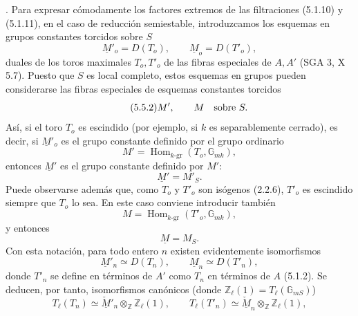 \par\medskip
{}. Para expresar cómodamente los factores extremos de las
filtraciones (5.1.10) y (5.1.11), en el caso de reducción semiestable,
introduzcamos los esquemas en grupos constantes torcidos sobre $S$
\begin{equation}\tag{5.5.1}
 \underline M'_o=D(T_o),\qquad \underline M_o=D(T'_o),
\end{equation}
duales de los toros maximales $T_o,T'_o$ de las fibras especiales de
$A,A'$ (SGA 3, X 5.7). Puesto que $S$ es local completo, estos esquemas
en grupos pueden considerarse las fibras especiales de esquemas
constantes torcidos
\begin{equation}\tag{5.5.2}
 \underline M',\qquad \underline M\quad\hbox{sobre }S.
\end{equation}
Así, si el toro $T_o$ es escindido (por ejemplo, si $k$ es
separablemente cerrado), es decir, si $\underline M'_o$ es el grupo
constante definido por el grupo ordinario
\begin{equation}\tag{5.5.3}
 M'=\operatorname{Hom}_{k\text{-}\mathrm{gr}}(T_o,\mathbb G_{mk}),
\end{equation}
entonces $\underline M'$ es el grupo constante definido por $M'$:
\begin{equation*}
 \underline M'=M'_S.
\end{equation*}
Puede observarse además que, como $T_o$ y $T'_o$ son isógenos (2.2.6),
$T'_o$ es escindido siempre que $T_o$ lo sea. En este caso conviene
introducir también
\begin{equation}\tag{5.5.4}
 M=\operatorname{Hom}_{k\text{-}\mathrm{gr}}(T'_o,\mathbb G_{mk}),
\end{equation}
y entonces
\begin{equation*}
 \underline M=M_S.
\end{equation*}
Con esta notación, para todo entero $n$ existen evidentemente
isomorfismos
\begin{equation}\tag{5.5.5}
 \underline M'_n\simeq D(T_n),\qquad
 \underline M_n\simeq D(T'_n),
\end{equation}
donde $T'_n$ se define en términos de $A'$ como $T_n$ en términos de
$A$ (5.1.2). Se deducen, por tanto, isomorfismos canónicos (donde
$\mathbb Z_\ell(1)=T_\ell(\mathbb G_{mS})$)
\begin{equation}\tag{5.5.6}
 T_\ell(T_n)\simeq
 \check{\underline M}'_n\otimes_{\mathbb Z}\mathbb Z_\ell(1),
 \qquad
 T_\ell(T'_n)\simeq
 \check{\underline M}_n\otimes_{\mathbb Z}\mathbb Z_\ell(1),
\end{equation}
